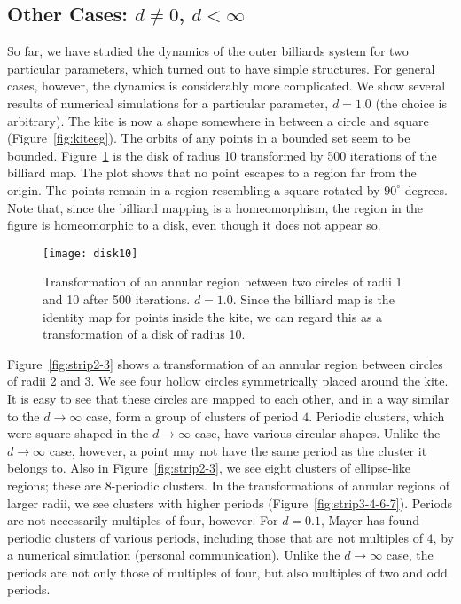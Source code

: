 \documentclass[10pt,twoside]{book}
\begin{document}
\subsection*{Other Cases: $d \neq 0$, $d < \infty$}
So far, we have studied the dynamics of the outer billiards system for two particular parameters, which turned out to have simple structures.
For general cases, however, the dynamics is considerably more complicated.
We show several results of numerical simulations for a particular parameter, $d = 1.0$ (the choice is arbitrary).
The kite is now a shape somewhere in between a circle and square (Figure~\ref{fig:kiteeg}).
The orbits of any points in a bounded set seem to be bounded.
Figure~\ref{fig:disk10} is the disk of radius 10 transformed by 500 iterations of the billiard map.
The plot shows that no point escapes to a region far from the origin.
The points remain in a region resembling a square rotated by $90^\circ$ degrees.
Note that, since the billiard mapping is a homeomorphism, the region in the figure is homeomorphic to a disk, even though it does not appear so.
\begin{figure}[ht]
  \begin{center}
    \texttt{[image: disk10]}
    \caption{Transformation of an annular region between two circles of radii 1 and 10 after 500 iterations.
      $d = 1.0$.
      Since the billiard map is the identity map for points inside the kite, we can regard this as a transformation of a disk of radius 10.
    }
    \label{fig:disk10}
  \end{center}
\end{figure}

Figure~\ref{fig:strip2-3} shows a transformation of an annular region between circles of radii 2 and 3.
We see four hollow circles symmetrically placed around the kite.
It is easy to see that these circles are mapped to each other, and in a way similar to the $d \to \infty$ case, form a group of clusters of period $4$.
Periodic clusters, which were square-shaped in the $d \to \infty$ case, have various circular shapes.
Unlike the $d \to \infty$ case, however, a point may not have the same period as the cluster it belongs to.
Also in Figure~\ref{fig:strip2-3}, we see eight clusters of ellipse-like regions; these are 8-periodic clusters.
In the transformations of annular regions of larger radii, we see clusters with higher periods (Figure~\ref{fig:strip3-4-6-7}).
Periods are not necessarily multiples of four, however.
For $d = 0.1$, Mayer has found periodic clusters of various periods, including those that are not multiples of 4, by a numerical simulation (personal communication).
Unlike the $d \to \infty$ case, the periods are not only those of multiples of four, but also multiples of two and odd periods.
\end{document}
